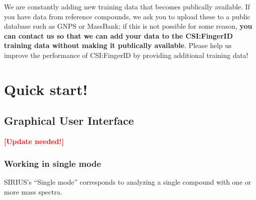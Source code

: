 \documentclass[letterpaper,10pt,openany,oneside]{sphinxmanual}
\newcommand{\todo}[1]{\xspace{\bfseries\sffamily\textcolor{red}{[#1]}}\xspace}
\begin{document}
We are constantly adding new training data that becomes publically available.
If you have data from reference compounds, we ask you to upload these to a
public database such as GNPS or MassBank; if this is not possible for some
reason, \textbf{you can contact us so that we can add your data to the
CSI:FingerID training data without making it publically available}.  Please
help us improve the performance of CSI:FingerID by providing additional
training data!



\chapter{Quick start!}
\section{Graphical User Interface} \todo{Update needed!}
\subsection{Working in single mode}
\label{gui:working-in-single-mode}

SIRIUS's ``Single mode'' corresponds to analyzing a single compound with
one or more mass spectra.
\end{document}

